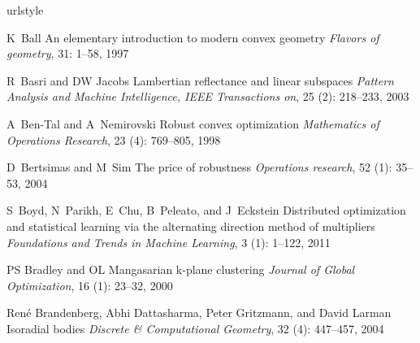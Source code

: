 \documentclass[12pt,heading]{ctexbook}
\begin{document}


\frontmatter
\tableofcontents

\mainmatter










%



\backmatter
\begin{thebibliography}{99}
    \providecommand{\natexlab}[1]{#1}
    \providecommand{\url}[1]{\texttt{#1}}
    \expandafter\ifx\csname urlstyle\endcsname\relax
    \providecommand{\doi}[1]{doi: #1}\else
    \providecommand{\doi}{doi: \begingroup \urlstyle{rm}\Url}\fi

    K~Ball
    \newblock An elementary introduction to modern convex geometry
    \newblock \emph{Flavors of geometry}, 31: 1--58, 1997

    R~Basri and DW Jacobs
    \newblock Lambertian reflectance and linear subspaces
    \newblock \emph{Pattern Analysis and Machine Intelligence, IEEE Transactions
    on}, 25 (2): 218--233, 2003

    A~Ben-Tal and A~Nemirovski
    \newblock Robust convex optimization
    \newblock \emph{Mathematics of Operations Research}, 23 (4):
    769--805, 1998

    D~Bertsimas and M~Sim
    \newblock The price of robustness
    \newblock \emph{Operations research}, 52 (1): 35--53, 2004

    S~Boyd, N~Parikh, E~Chu, B~Peleato, and J~Eckstein
    \newblock Distributed optimization and statistical learning via the alternating
    direction method of multipliers
    \newblock \emph{Foundations and Trends{\textregistered} in Machine Learning},
    3 (1): 1--122, 2011

    PS Bradley and OL Mangasarian
    \newblock k-plane clustering
    \newblock \emph{Journal of Global Optimization}, 16 (1):
    23--32, 2000

    Ren{\'e} Brandenberg, Abhi Dattasharma, Peter Gritzmann, and David Larman
    \newblock Isoradial bodies
    \newblock \emph{Discrete \& Computational Geometry}, 32 (4):
    447--457, 2004


\end{thebibliography}
\end{document}
